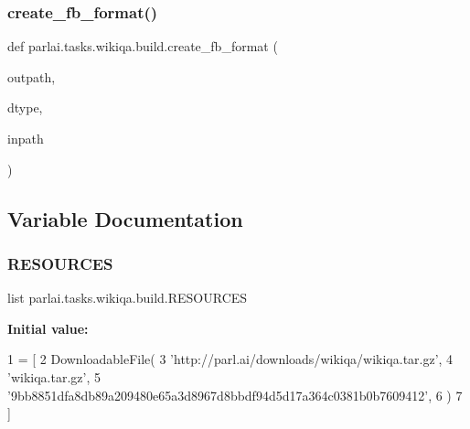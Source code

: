 \mbox{\label{namespaceparlai_1_1tasks_1_1wikiqa_1_1build_a554828702769592403db58c955d1dfe3}} 
\subsubsection{\texorpdfstring{create\+\_\+fb\+\_\+format()}{create\_fb\_format()}}
{\footnotesize\ttfamily def parlai.\+tasks.\+wikiqa.\+build.\+create\+\_\+fb\+\_\+format (\begin{DoxyParamCaption}\item[{}]{outpath,  }\item[{}]{dtype,  }\item[{}]{inpath }\end{DoxyParamCaption})}



\subsection{Variable Documentation}
\mbox{\label{namespaceparlai_1_1tasks_1_1wikiqa_1_1build_ae5b28b5acb8be66f26ddbf15bc4d92ec}} 
\subsubsection{\texorpdfstring{R\+E\+S\+O\+U\+R\+C\+ES}{RESOURCES}}
{\footnotesize\ttfamily list parlai.\+tasks.\+wikiqa.\+build.\+R\+E\+S\+O\+U\+R\+C\+ES}

{\bfseries Initial value\+:}
\begin{DoxyCode}
1 =  [
2     DownloadableFile(
3         \textcolor{stringliteral}{'http://parl.ai/downloads/wikiqa/wikiqa.tar.gz'},
4         \textcolor{stringliteral}{'wikiqa.tar.gz'},
5         \textcolor{stringliteral}{'9bb8851dfa8db89a209480e65a3d8967d8bbdf94d5d17a364c0381b0b7609412'},
6     )
7 ]
\end{DoxyCode}

